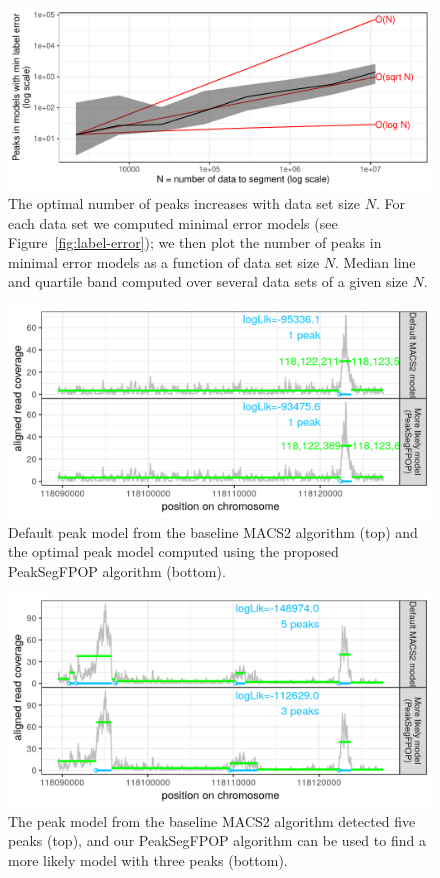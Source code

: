 \documentclass[article]{jss}
\begin{document}
\begin{figure}[t!]
\centering
\includegraphics{jss-figure-data-peaks}
\caption{\label{fig:data-peaks} The optimal number of peaks increases
  with data set size $N$. For each data set we computed minimal error
  models (see Figure~\ref{fig:label-error}); we then plot the number of peaks in
  minimal error models as a function of data set size $N$. Median line
  and quartile band computed over several data sets of a given size $N$.}
\end{figure}
  
\begin{figure}[t!]
\centering
\includegraphics{jss-figure-more-likely-models-one-peak}
\caption{\label{fig:one-peak} Default peak model from the baseline
  MACS2 algorithm (top) and the optimal peak model computed using the
  proposed PeakSegFPOP algorithm (bottom).}
\end{figure}

\begin{figure}[t!]
\centering
\includegraphics{jss-figure-more-likely-models-three-peaks}
\caption{\label{fig:three-peaks} The peak model from the baseline
  MACS2 algorithm detected five peaks (top), and our PeakSegFPOP
  algorithm can be used to find a more likely model with three peaks
  (bottom).}
\end{figure}
 
\end{document}
